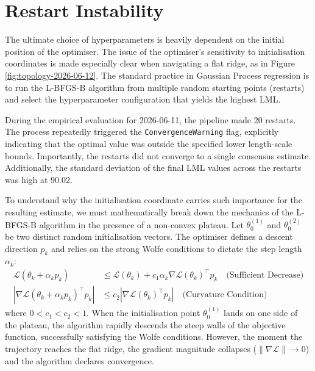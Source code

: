 \documentclass[12pt,oneside]{report}
\theoremstyle{definition}
\theoremstyle{remark}
\begin{document}
\section{Restart Instability}
\label{sec:restart_instability}
The ultimate choice of hyperparameters is heavily dependent on the initial position of the optimiser. The issue of the optimiser's sensitivity to initialisation coordinates is made especially clear when navigating a flat ridge, as in Figure \ref{fig:topology-2026-06-12}. The standard practice in Gaussian Process regression is to run the L-BFGS-B algorithm from multiple random starting points (restarts) and select the hyperparameter configuration that yields the highest LML. 

During the empirical evaluation for 2026-06-11, the pipeline made 20 restarts. The process repeatedly triggered the \texttt{ConvergenceWarning} flag, explicitly indicating that the optimal value was outside the specified lower length-scale bounds. Importantly, the restarts did not converge to a single consensus estimate. Additionally, the standard deviation of the final LML values across the restarts was high at 90.02.

To understand why the initialisation coordinate carries such importance for the resulting estimate, we must mathematically break down the mechanics of the L-BFGS-B algorithm in the presence of a non-convex plateau. Let $\theta_0^{(1)}$ and $\theta_0^{(2)}$ be two distinct random initialisation vectors. The optimiser defines a descent direction $p_k$ and relies on the strong Wolfe conditions to dictate the step length $\alpha_k$:
\begin{align}
    \mathcal{L}(\theta_k + \alpha_k p_k) &\leq \mathcal{L}(\theta_k) + c_1 \alpha_k \nabla \mathcal{L}(\theta_k)^\top p_k \quad \text{(Sufficient Decrease)} \\
    |\nabla \mathcal{L}(\theta_k + \alpha_k p_k)^\top p_k| &\leq c_2 |\nabla \mathcal{L}(\theta_k)^\top p_k| \quad \text{(Curvature Condition)} \label{eq:curvature_condition}
\end{align}
where $0 < c_1 < c_2 < 1$. When the initialisation point $\theta_0^{(1)}$ lands on one side of the plateau, the algorithm rapidly descends the steep walls of the objective function, successfully satisfying the Wolfe conditions. However, the moment the trajectory reaches the flat ridge, the gradient magnitude collapses ($\|\nabla \mathcal{L}\| \to 0$) and the algorithm declares convergence. 
\end{document}
